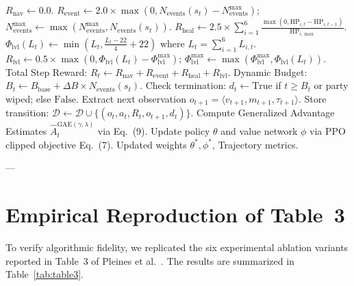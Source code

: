 \documentclass[conference]{IEEEtran}
\begin{document}
\begin{algorithm}[t]
\begin{algorithmic}[1]
    \ELSE
        \STATE $R_{\text{nav}} \leftarrow 0.0$.
    \ENDIF
    \STATE $R_{\text{event}} \leftarrow 2.0 \times \max(0, N_{\text{events}}(s_t) - N_{\text{events}}^{\max})$; \quad $N_{\text{events}}^{\max} \leftarrow \max(N_{\text{events}}^{\max}, N_{\text{events}}(s_t))$.
    \STATE $R_{\text{heal}} \leftarrow 2.5 \times \sum_{i=1}^6 \frac{\max(0, \text{HP}_{i,t} - \text{HP}_{i,t-1})}{\text{HP}_{i,\max}}$.
    \STATE $\Phi_{\text{lvl}}(L_t) \leftarrow \min(L_t, \frac{L_t - 22}{4} + 22)$ where $L_t = \sum_{i=1}^6 L_{i,t}$.
    \STATE $R_{\text{lvl}} \leftarrow 0.5 \times \max(0, \Phi_{\text{lvl}}(L_t) - \Phi_{\text{lvl}}^{\max})$; \quad $\Phi_{\text{lvl}}^{\max} \leftarrow \max(\Phi_{\text{lvl}}^{\max}, \Phi_{\text{lvl}}(L_t))$.
    \STATE Total Step Reward: $R_t \leftarrow R_{\text{nav}} + R_{\text{event}} + R_{\text{heal}} + R_{\text{lvl}}$.
    \STATE Dynamic Budget: $B_t \leftarrow B_{\text{base}} + \Delta B \times N_{\text{events}}(s_t)$.
    \STATE Check termination: $d_t \leftarrow \text{True}$ if $t \ge B_t$ or party wiped; else $\text{False}$.
    \STATE Extract next observation $o_{t+1} = \langle v_{t+1}, m_{t+1}, \tau_{t+1} \rangle$.
    \STATE Store transition: $\mathcal{D} \leftarrow \mathcal{D} \cup \{ (o_t, a_t, R_t, o_{t+1}, d_t) \}$.
\ENDFOR
\STATE Compute Generalized Advantage Estimates $\hat{A}_t^{\text{GAE}(\gamma, \lambda)}$ via Eq.~(9).
\STATE Update policy $\theta$ and value network $\phi$ via PPO clipped objective Eq.~(7).
\RETURN Updated weights $\theta^*, \phi^*$, Trajectory metrics.
\end{algorithmic}
\end{algorithm}

---

\section{Empirical Reproduction of Table~3}

To verify algorithmic fidelity, we replicated the six experimental ablation variants reported in Table~3 of Pleines et al.~\cite{pleines2025playing}. The results are summarized in Table~\ref{tab:table3}.
\end{document}

